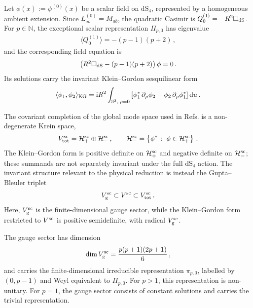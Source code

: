 \documentclass{SciPost}
\begin{document}
Let $\phi(x):=\psi^{(0)}(x)$ be a scalar field on $\mathrm{dS}_4$, represented by a homogeneous ambient extension. Since $L^{(0)}_{ab}=M_{ab}$, the quadratic Casimir is $Q^{(1)}_0=-R^2\square_{\rm dS}$. For $p\in\mathbb N$, the exceptional scalar representation $\Pi_{p,0}$ has eigenvalue
\begin{align}
    \langle Q^{(1)}_0\rangle=-(p-1)(p+2) \,,
\end{align}
and the corresponding field equation is
\begin{align}\label{eq:scalar-dS-wave}
    \left(
        R^2\square_{\rm dS}-(p-1)(p+2)
    \right)\phi=0 \,.
\end{align}
Its solutions carry the invariant Klein--Gordon sesquilinear form
\begin{align}
    \langle\phi_1,\phi_2\rangle_{\rm KG}
    =
    \mathrm{i}R^2
    \int_{\mathbb S^3,\;\rho=0}
    \left[
        \phi_1^\ast\,\partial_\rho\phi_2
        -\phi_2\,\partial_\rho\phi_1^\ast
    \right]\mathrm{d}u \,.
\end{align}

The covariant completion of the global mode space used in Refs. \cite{Bajalan2026,bajalan2026araki} is a non-degenerate Krein space,
\begin{align}
    V_{\rm tot}^{\rm sc}
    =
    {\cal H}_{+}^{\rm sc}\oplus{\cal H}_{-}^{\rm sc} \,,
    \qquad
    {\cal H}_{-}^{\rm sc}
    =
    \left\{
        \phi^\ast\;\colon\;\phi\in{\cal H}_{+}^{\rm sc}
    \right\} \,.
\end{align}
The Klein--Gordon form is positive definite on ${\cal H}_{+}^{\rm sc}$ and negative definite on ${\cal H}_{-}^{\rm sc}$; these summands are not separately invariant under the full $\mathrm{dS}_4$ action. The invariant structure relevant to the physical reduction is instead the Gupta--Bleuler triplet 
\begin{align}\label{GBScalar}
    V_{\rm g}^{\rm sc}
    \subset V^{\rm sc}
    \subset V_{\rm tot}^{\rm sc} \,.
\end{align}
Here, $V_{\rm g}^{\rm sc}$ is the finite-dimensional gauge sector, while the Klein--Gordon form restricted to $V^{\rm sc}$ is positive semidefinite, with radical $V_{\rm g}^{\rm sc}$.

The gauge sector has dimension
\begin{align}
    \dim V_{\rm g}^{\rm sc}
    =
    \frac{p(p+1)(2p+1)}{6} \,,
\end{align}
and carries the finite-dimensional irreducible representation $\pi_{p,0}$, labelled by $(0,p-1)$ and Weyl equivalent to $\Pi_{p,0}$. For $p>1$, this representation is non-unitary. For $p=1$, the gauge sector consists of constant solutions and carries the trivial representation.
\end{document}
